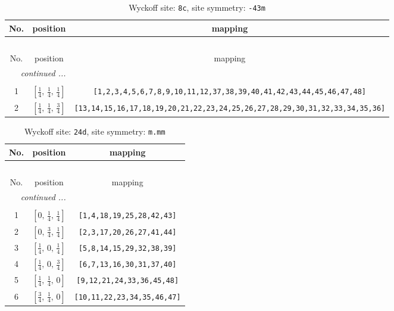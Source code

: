 \documentclass[fleqn,8pt]{jsarticle}
\begin{document}
\renewcommand{\arraystretch}{1.2}
\begin{longtable}{ccc}
\caption{Wyckoff site: {\tt 8c}, site symmetry: {\tt -43m}}
 \\
 \hline \hline
No. & position & mapping \\ \hline \endfirsthead

\multicolumn{2}{l}{\tablename\ \thetable{}} \\
 \hline \hline
No. & position & mapping \\ \hline \endhead

 \hline \hline
\multicolumn{2}{r}{\footnotesize\it continued ...} \\ \endfoot

 \hline \hline
\multicolumn{2}{r}{} \\ \endlastfoot

1 & $\left[ \frac{1}{4},\, \frac{1}{4},\, \frac{1}{4} \right]$ & {\tt [1,2,3,4,5,6,7,8,9,10,11,12,37,38,39,40,41,42,43,44,45,46,47,48]} \\ \hline
2 & $\left[ \frac{1}{4},\, \frac{1}{4},\, \frac{3}{4} \right]$ & {\tt [13,14,15,16,17,18,19,20,21,22,23,24,25,26,27,28,29,30,31,32,33,34,35,36]} \\
\end{longtable}
\renewcommand{\arraystretch}{1.2}
\begin{longtable}{ccc}
\caption{Wyckoff site: {\tt 24d}, site symmetry: {\tt m.mm}}
 \\
 \hline \hline
No. & position & mapping \\ \hline \endfirsthead

\multicolumn{2}{l}{\tablename\ \thetable{}} \\
 \hline \hline
No. & position & mapping \\ \hline \endhead

 \hline \hline
\multicolumn{2}{r}{\footnotesize\it continued ...} \\ \endfoot

 \hline \hline
\multicolumn{2}{r}{} \\ \endlastfoot

1 & $\left[ 0,\, \frac{1}{4},\, \frac{1}{4} \right]$ & {\tt [1,4,18,19,25,28,42,43]} \\ \hline
2 & $\left[ 0,\, \frac{3}{4},\, \frac{1}{4} \right]$ & {\tt [2,3,17,20,26,27,41,44]} \\ \hline
3 & $\left[ \frac{1}{4},\, 0,\, \frac{1}{4} \right]$ & {\tt [5,8,14,15,29,32,38,39]} \\ \hline
4 & $\left[ \frac{1}{4},\, 0,\, \frac{3}{4} \right]$ & {\tt [6,7,13,16,30,31,37,40]} \\ \hline
5 & $\left[ \frac{1}{4},\, \frac{1}{4},\, 0 \right]$ & {\tt [9,12,21,24,33,36,45,48]} \\ \hline
6 & $\left[ \frac{3}{4},\, \frac{1}{4},\, 0 \right]$ & {\tt [10,11,22,23,34,35,46,47]} \\
\end{longtable}
\end{document}
